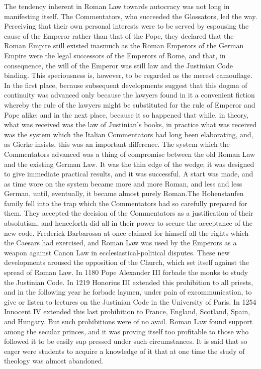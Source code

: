 \documentclass{book}
\begin{document}
The tendency inherent in Roman Law towards autocracy was not long in manifesting itself. The Commentators, who succeeded the Glossators, led the way. Perceiving that their own personal interests were to be served by espousing the cause of the Emperor rather than that of the Pope, they declared that the Roman Empire still existed inasmuch as the Roman Emperors of the German Empire were the legal successors of the Emperors of Rome, and that, in consequence, the will of the Emperor was still law and the Justinian Code binding. This speciousness is, however, to be regarded as the merest camouflage. In the first place, because subsequent developments suggest that this dogma of continuity was advanced only because the lawyers found in it a convenient fiction whereby the rule of the lawyers might be substituted for the rule of Emperor and Pope alike; and in the next place, because it so happened that while, in theory, what was received was the law of Justinian’s books, in practice what was received was the system which the Italian Commentators had long been elaborating, and, as Gierke insists, this was an important difference. The system which the Commentators advanced was a thing of compromise between the old Roman Law and the existing German Law. It was the thin edge of the wedge; it was designed to give immediate practical results, and it was successful. A start was made, and as time wore on the system became more and more Roman, and less and less German, until, eventually, it became almost purely Roman.\footnotemark[3] The Hohenstaufen family fell into the trap which the Commentators had so carefully prepared for them. They accepted the decision of the Commentators as a justification of their absolutism, and henceforth did all in their power to secure the acceptance of the new code. Frederick Barbarossa at once claimed for himself all the rights which the Caesars had exercised, and Roman Law was used by the Emperors as a weapon against Canon Law in ecclesiastical-political disputes. These new developments aroused the opposition of the Church, which set itself against the spread of Roman Law. In 1180 Pope Alexander III forbade the monks to study the Justinian Code. In 1219 Honorius III extended this prohibition to all priests, and in the following year he forbade laymen, under pain of excommunication, to give or listen to lectures on the Justinian Code in the University of Paris. In 1254 Innocent IV extended this last prohibition to France, England, Scotland, Spain, and Hungary. But such prohibitions were of no avail. Roman Law found support among the secular princes, and it was proving itself too profitable to those who followed it to be easily sup pressed under such circumstances. It is said that so eager were students to acquire a knowledge of it that at one time the study of theology was almost abandoned.
\end{document}
